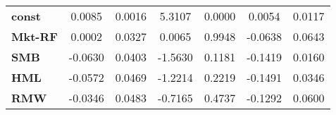 \begin{center}
\begin{tabular}{lcccccc}
\midrule
\textbf{const}  &       0.0085       &       0.0016       &      5.3107     &      0.0000      &       0.0054      &       0.0117       \\
\textbf{Mkt-RF} &       0.0002       &       0.0327       &      0.0065     &      0.9948      &      -0.0638      &       0.0643       \\
\textbf{SMB}    &      -0.0630       &       0.0403       &     -1.5630     &      0.1181      &      -0.1419      &       0.0160       \\
\textbf{HML}    &      -0.0572       &       0.0469       &     -1.2214     &      0.2219      &      -0.1491      &       0.0346       \\
\textbf{RMW}    &      -0.0346       &       0.0483       &     -0.7165     &      0.4737      &      -0.1292      &       0.0600       \\
\bottomrule
\end{tabular}
\end{center}
